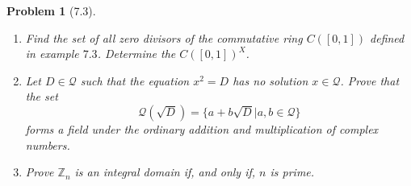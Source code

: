 \documentclass[10pt]{article}
\newcommand{\sk}{\vskip 10mm}
\newcommand{\bb}[1]{\mathbb{#1}}
\theoremstyle{plain}
\newtheorem{problem}{Problem}
\theoremstyle{remark}
\begin{document}
\sk

\begin{problem}[7.3]
  \begin{enumerate}
  \item Find the set of all zero divisors of the commutative ring $C([0,1])$
    defined in example $7.3$. Determine the $C([0,1])^X$.
  \item Let $D\in\mathcal{Q}$ such that the equation $x^2=D$ has no solution
    $x\in\mathcal{Q}$. Prove that the set
    \[ \mathcal{Q}(\sqrt{D})=\{a+b\sqrt{D}|a,b\in\mathcal{Q}\}\]
    forms a field under the ordinary addition and multiplication of
    complex numbers.
   \item Prove $\bb{Z}_n$ is an integral domain if, and only if, $n$ is prime.
  \end{enumerate}
\end{problem}
\end{document}
